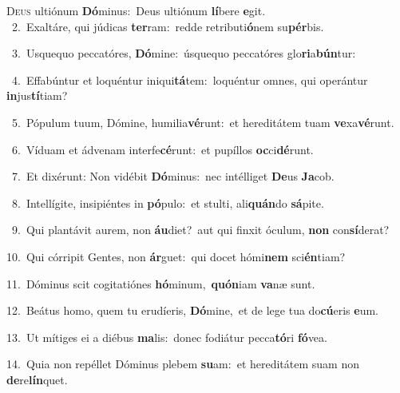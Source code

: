 \lettrine{\initial\textcolor{\initialcolor}{D}}{eus} ultiónum \textbf{Dó}\-minus:~\star Deus ultiónum \textbf{lí}\-bere \textbf{e}\-git.\\
{\numbfont\textcolor{\numbcolor}{~2.}}~Exaltáre, qui júdicas \textbf{ter}\-ram:~\star redde retributi\-\textbf{ó}\-nem su\-\textbf{pér}\-bis.\par
{\numbfont\textcolor{\numbcolor}{~3.}}~Usquequo peccatóres, \textbf{Dó}\-mine:~\star úsquequo peccatóres glo\-\textbf{ri}\-a\-\textbf{bún}\-tur:\par
{\numbfont\textcolor{\numbcolor}{~4.}}~Effabúntur et loquéntur iniqui\-\textbf{tá}\-tem:~\star loquéntur omnes, qui operántur \textbf{in}\-jus\-\textbf{tí}\-tiam?\par
{\numbfont\textcolor{\numbcolor}{~5.}}~Pópulum tuum, Dómine, humilia\-\textbf{vé}\-runt:~\star et hereditátem tuam \textbf{ve}\-xa\-\textbf{vé}\-runt.\par
{\numbfont\textcolor{\numbcolor}{~6.}}~Víduam et ádvenam interfe\-\textbf{cé}\-runt:~\star et pupíllos \textbf{oc}\-ci\-\textbf{dé}\-runt.\par
{\numbfont\textcolor{\numbcolor}{~7.}}~Et dixérunt: Non vidébit \textbf{Dó}\-minus:~\star nec intélliget \textbf{De}\-us \textbf{Ja}\-cob.\par
{\numbfont\textcolor{\numbcolor}{~8.}}~Intellígite, insipiéntes in \textbf{pó}\-pulo:~\star et stulti, ali\-\textbf{quán}\-do \textbf{sá}\-pite.\par
{\numbfont\textcolor{\numbcolor}{~9.}}~Qui plantávit aurem, non \textbf{áu}\-diet?~\star aut qui finxit óculum, \textbf{non} con\-\textbf{sí}\-derat?\par
{\numbfont\textcolor{\numbcolor}{10.}}~Qui córripit Gentes, non \textbf{ár}\-guet:~\star qui docet hómi\textbf{nem} sci\-\textbf{én}\-tiam?\par
{\numbfont\textcolor{\numbcolor}{11.}}~Dóminus scit cogitatiónes \textbf{hó}\-minum,~\star \textbf{quón}\-iam \textbf{va}\-næ sunt.\par
{\numbfont\textcolor{\numbcolor}{12.}}~Beátus homo, quem tu erudíeris, \textbf{Dó}\-mine,~\star et de lege tua do\-\textbf{cú}\-eris \textbf{e}\-um.\par
{\numbfont\textcolor{\numbcolor}{13.}}~Ut mítiges ei a diébus \textbf{ma}\-lis:~\star donec fodiátur pecca\-\textbf{tó}\-ri \textbf{fó}\-vea.\par
{\numbfont\textcolor{\numbcolor}{14.}}~Quia non repéllet Dóminus plebem \textbf{su}\-am:~\star et hereditátem suam non \textbf{de}\-re\-\textbf{lín}\-quet.\par
